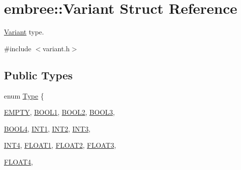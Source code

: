 \hypertarget{structembree_1_1_variant}{
\section{embree::Variant Struct Reference}
\label{structembree_1_1_variant}
}


\hyperlink{structembree_1_1_variant}{Variant} type.  




{\ttfamily \#include $<$variant.h$>$}

\subsection*{Public Types}
\begin{DoxyCompactItemize}
\item 
enum \hyperlink{structembree_1_1_variant_a10807086db8e8d61a05b0730b496e26b}{Type} \{ \par
\hyperlink{structembree_1_1_variant_a10807086db8e8d61a05b0730b496e26ba7a95d5c7ee1f9261800fd605321f7347}{EMPTY}, 
\hyperlink{structembree_1_1_variant_a10807086db8e8d61a05b0730b496e26baa2a0553ee52bcf7025f67405238203b3}{BOOL1}, 
\hyperlink{structembree_1_1_variant_a10807086db8e8d61a05b0730b496e26ba2d6def946ed0d8d77966f42a5560cd10}{BOOL2}, 
\hyperlink{structembree_1_1_variant_a10807086db8e8d61a05b0730b496e26baa6f2e0db83425b11f95417d49cfc2178}{BOOL3}, 
\par
\hyperlink{structembree_1_1_variant_a10807086db8e8d61a05b0730b496e26ba3b43f712a9fa8eee87ef8746411bd25e}{BOOL4}, 
\hyperlink{structembree_1_1_variant_a10807086db8e8d61a05b0730b496e26ba6b21a79d06c7cf24ea62716f4f55e445}{INT1}, 
\hyperlink{structembree_1_1_variant_a10807086db8e8d61a05b0730b496e26ba010264e693e664c56b75f56537cdc7ab}{INT2}, 
\hyperlink{structembree_1_1_variant_a10807086db8e8d61a05b0730b496e26badc4ef96ee509224b65d85c487322df37}{INT3}, 
\par
\hyperlink{structembree_1_1_variant_a10807086db8e8d61a05b0730b496e26ba4aa63d4cd3a53260ce9207dacfd11b23}{INT4}, 
\hyperlink{structembree_1_1_variant_a10807086db8e8d61a05b0730b496e26bae4e93eb8d07f6622af20641432bfa39f}{FLOAT1}, 
\hyperlink{structembree_1_1_variant_a10807086db8e8d61a05b0730b496e26ba0bb447feb257c8cb9a2e12458f92639b}{FLOAT2}, 
\hyperlink{structembree_1_1_variant_a10807086db8e8d61a05b0730b496e26bac8cea71d88a1c32cc6a621c8de454ef8}{FLOAT3}, 
\par
\hyperlink{structembree_1_1_variant_a10807086db8e8d61a05b0730b496e26bacf356e7e390e41b716158fcb455df65b}{FLOAT4}, 

\end{DoxyCompactItemize}

